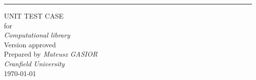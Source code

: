 \begin{flushright}
    \rule{16cm}{5pt}\vskip1cm
    \begin{bfseries}
        \Huge{UNIT TEST CASE}\\
        \vspace{1.9cm}
        for\\
        \vspace{1.9cm}
	    \textit{Computational library}\\
        \vspace{1.9cm}
        \LARGE{Version \myversion approved}\\
        \vspace{1.9cm}
        Prepared by \textit{Mateusz GASIOR}\\
        \vspace{1.9cm}
        \textit{Cranfield University}\\
        \vspace{1.9cm}
        \today\\
    \end{bfseries}
\end{flushright}